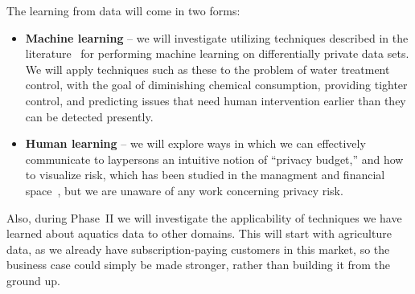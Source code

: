 The learning from data will come in two forms:
\begin{itemize}
\item {\bf Machine learning} -- we will investigate utilizing techniques
described in the literature~\cite{acgmmtz16,fs10,ss15} for performing machine
learning on differentially private data sets.
We will apply techniques such as these to the problem of water treatment
control, with the goal of diminishing chemical consumption, providing
tighter control, and predicting issues that need human intervention
earlier than they can be detected presently.
\item {\bf Human learning} -- we will explore ways in which we can effectively
communicate to laypersons an intuitive notion of ``privacy budget,'' and
how to visualize risk, which has been studied in the
managment and
financial space~\cite{Eppler09,Sarlin16}, but we are unaware of any
work concerning privacy risk.
\end{itemize}

Also, during Phase~II we will investigate the applicability of techniques
we have learned about aquatics data to other domains.  This will start with
agriculture data, as we already have subscription-paying customers in
this market, so the business case could simply be made stronger, rather
than building it from the ground up.
